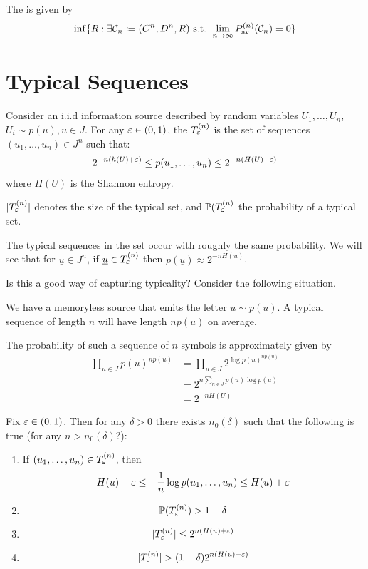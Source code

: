 \documentclass[]{article}
\newcommand{\av}{\textrm{av}}
\begin{document}
The  is given by
\begin{align*}
    \inf\{ R:\exists \mathcal{C}_n\coloneqq (C^n,D^n,R) \textrm{ s.t. } \lim\limits_{n\ra\infty} P_{\av}^{(n)}(\mathcal{C}_n) = 0\}
\end{align*}

\section*{Typical Sequences}

\begin{defin*}
    Consider an i.i.d information source described by random variables $U_1,\dots,U_n$, $U_i\sim p(u),u\in J$. For any $\varepsilon\in (0,1)$, the  $T_\varepsilon^{(n)}$ is the set of sequences $(u_1,\dots,u_n)\in J^n$ such that:
    \begin{align*}
        2^{-n(h(U)+\varepsilon)}\le p(u_1,\dots,u_n)\le 2^{-n(H(U)-\varepsilon)}
    \end{align*}
    where $H(U)$ is the Shannon entropy.

    $|T_\varepsilon^{(n)}|$ denotes the size of the typical set, and $\mathbb{P}(T_\varepsilon^{(n)}$ the probability of a typical set.

    The typical sequences in the set occur with roughly the same probability. We will see that for $\underline{u}\in J^n$, if $\underline{u} \in T_\varepsilon^{(n)}$ then $p(\underline{u})\approx 2^{-nH(u)}$.
\end{defin*}

Is this a good way of capturing typicality? Consider the following situation.

We have a memoryless source that emits the letter $u\sim p(u)$. A typical sequence of length $n$ will have length $n p(u)$ on average.

The probability of such a sequence of $n$ symbols is approximately given by 
\begin{align*}
    \prod_{u\in J}p(u)^{np(u)} &= \prod_{u\in J}2^{\log p(u)^{np(u)}}\\
    &= 2^{n\sum_{n\in J}p(u)\log p(u)}\\
    &= 2^{-nH(U)}
\end{align*}

\begin{theorem}
    Fix $\varepsilon \in (0,1)$. Then for any $\delta > 0$ there exists $n_0(\delta)$ such that the following is true (for any $n > n_0(\delta)$?):
    \begin{enumerate}
        \item If $(u_1,\dots,u_n)\in T_\varepsilon^{(n)}$, then $$H(u) - \varepsilon \le -\frac{1}{n} \log p(u_1,\dots,u_n) \le H(u) + \varepsilon$$
        \item $$\mathbb{P}(T_\varepsilon^{(n)}) > 1 - \delta$$
        \item $$|T_\varepsilon^{(n)}| \le 2^{n(H(u)+\varepsilon)}$$
        \item $$|T_\varepsilon^{(n)}| > (1-\delta) 2^{n(H(u)-\varepsilon)}$$
    \end{enumerate}
\end{theorem}
\end{document}
